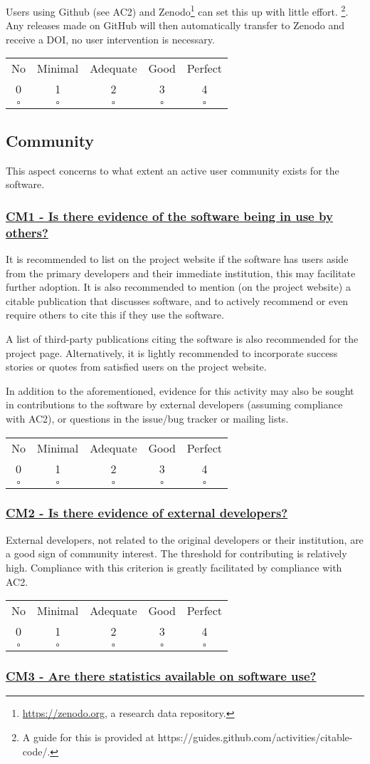 \documentclass[a4paper,11pt]{article}
\newcommand{\criterion}[2]{\subsubsection*{\underline{#1 - #2}}\label{id:#1}}
\newcommand\CheckTable{%
  \begin{tabular}{ccccc}
    No & Minimal & Adequate & Good & Perfect \\
    0 & 1 & 2 & 3 & 4 \\
    \hline
    $\square$ & $\square$ & $\square$ & $\square$ & $\square$ \\
  \end{tabular}%
}
\begin{document}
Users using Github (see AC2) and Zenodo\footnote{\url{https://zenodo.org}, a
research data repository.} can set this up with little effort. \footnote{A guide
for this is provided at https://guides.github.com/activities/citable-code/.}.
Any releases made on GitHub will then automatically transfer to Zenodo and
receive a DOI, no user intervention is necessary. 

\CheckTable

\subsection{Community}\label{sec:com}

This aspect concerns to what extent an active user community exists for the
software.

\newcommand{\cmOneID}{CM1}
\newcommand{\cmOneText}{Is there evidence of the software being in use by others?}
\criterion{\cmOneID}{\cmOneText}

It is recommended to list on the project website if the software has 
users aside from the primary developers and their immediate institution, this
may facilitate further adoption. It is also recommended to mention (on the
project website) a citable publication that discusses software, and to actively
recommend or even require others to cite this if they use the software.

A list of third-party publications citing the software is also recommended for
the project page. Alternatively, it is lightly recommended to
incorporate success stories or quotes from satisfied users on the project
website.

In addition to the aforementioned, evidence for this activity may also be sought
in contributions to the software by external developers (assuming
compliance with AC2), or questions in the issue/bug tracker or mailing lists.

\CheckTable

\newcommand{\cmTwoID}{CM2}
\newcommand{\cmTwoText}{Is there evidence of external developers?}
\criterion{\cmTwoID}{\cmTwoText}

External developers, not related to the original developers or their
institution, are a good sign of community interest. The threshold for
contributing is relatively high. Compliance with this criterion is greatly
facilitated by compliance with AC2.

\CheckTable

\newcommand{\cmThreeID}{CM3}
\newcommand{\cmThreeText}{Are there statistics available on software use?}
\criterion{\cmThreeID}{\cmThreeText}
\end{document}
